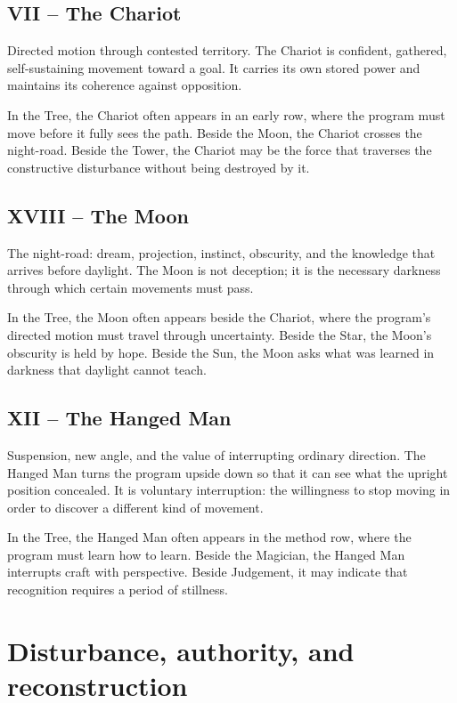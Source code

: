 \subsection{VII -- The Chariot}

Directed motion through contested territory. The Chariot is confident,
gathered, self-sustaining movement toward a goal. It carries its own stored
power and maintains its coherence against opposition.

In the Tree, the Chariot often appears in an early row, where the program must
move before it fully sees the path. Beside the Moon, the Chariot crosses the
night-road. Beside the Tower, the Chariot may be the force that traverses the
constructive disturbance without being destroyed by it.

\subsection{XVIII -- The Moon}

The night-road: dream, projection, instinct, obscurity, and the knowledge that
arrives before daylight. The Moon is not deception; it is the necessary
darkness through which certain movements must pass.

In the Tree, the Moon often appears beside the Chariot, where the program's
directed motion must travel through uncertainty. Beside the Star, the Moon's
obscurity is held by hope. Beside the Sun, the Moon asks what was learned in
darkness that daylight cannot teach.

\subsection{XII -- The Hanged Man}

Suspension, new angle, and the value of interrupting ordinary direction. The
Hanged Man turns the program upside down so that it can see what the upright
position concealed. It is voluntary interruption: the willingness to stop
moving in order to discover a different kind of movement.

In the Tree, the Hanged Man often appears in the method row, where the program
must learn how to learn. Beside the Magician, the Hanged Man interrupts craft
with perspective. Beside Judgement, it may indicate that recognition requires a
period of stillness.

\section{Disturbance, authority, and reconstruction}


